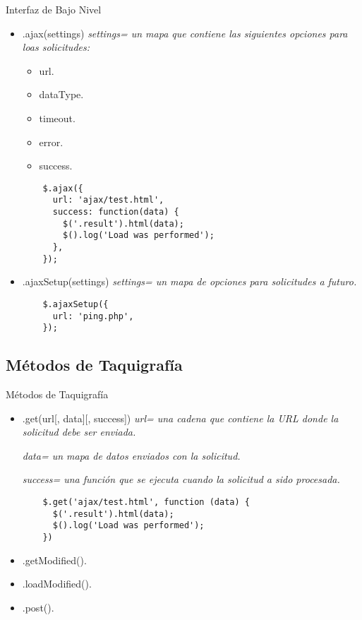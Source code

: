 \begin{frame}[fragile]{Interfaz de Bajo Nivel} %
\begin{itemize}
    \item .ajax(settings) \textit{ settings= un mapa que contiene las siguientes opciones para loas solicitudes:}
    \begin{itemize}
      \item url.
      \item dataType.
      \item timeout.
      \item error.
      \item success.
    \end{itemize}
    \begin{lstlisting}
    $.ajax({
      url: 'ajax/test.html', 
      success: function(data) {
        $('.result').html(data);
        $().log('Load was performed');
      }, 
    });
    \end{lstlisting}
    \item .ajaxSetup(settings) \textit{ settings= un mapa de opciones para
    solicitudes a futuro.} 
    \begin{lstlisting}
    $.ajaxSetup({
      url: 'ping.php', 
    });
    \end{lstlisting}
\end{itemize}
\end{frame}

\subsection{Métodos de Taquigrafía} %

\begin{frame}[fragile]{Métodos de Taquigrafía} %
\begin{itemize}
    \item .get(url[, data][, success]) \textit{ url= una cadena que contiene la URL donde la solicitud debe ser enviada.}

    \textit{ data= un mapa de datos enviados con la solicitud.}

    \textit{ success= una función que se ejecuta cuando la solicitud a sido procesada.}
    \begin{lstlisting}
    $.get('ajax/test.html', function (data) {
      $('.result').html(data);
      $().log('Load was performed');
    })
    \end{lstlisting}
    \item .getModified().
    \item .loadModified().
    \item .post().
\end{itemize}
\end{frame}

